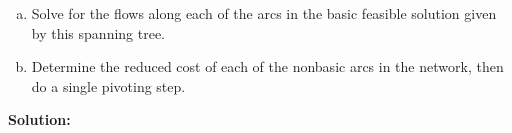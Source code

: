 \documentclass{article}
\begin{document}
\begin{enumerate}
\begin{figure}[h]
\begin{subfigure}
        \end{subfigure}
    \end{figure}

    \begin{enumerate}[(a)]
        \item Solve for the flows along each of the arcs in the basic feasible solution given by this spanning tree.

        \item Determine the reduced cost of each of the nonbasic arcs in the network, then do a single pivoting step.
        
    \end{enumerate}

    \textbf{Solution:} \\


    
\end{enumerate}
\end{document}
